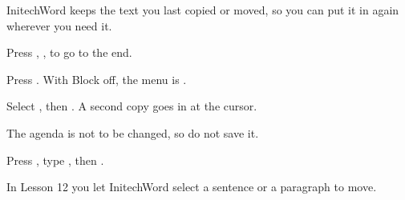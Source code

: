 InitechWord keeps the text you last copied or moved, so you can put it in
again wherever you need it.
\begin{WPSteps}
\item Press , ,  to go to the end.
\item Press .  With Block off, the menu is
.
\item Select , then .  A second copy goes
in at the cursor.
\end{WPSteps}

The agenda is not to be changed, so do not save it.
\begin{WPSteps}
\item Press , type , then .
\end{WPSteps}
\EndReplay
In Lesson 12 you let InitechWord select a sentence or a paragraph to move.
